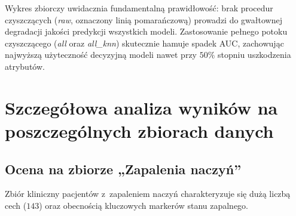 \begin{table}[H]
\centering
\caption{Średnia globalna wartość $\overline{\mathrm{AUC}}$ dla wszystkich badanych zbiorów danych i~modeli w~funkcji poziomu uszkodzeń dla 7 badanych strategii}
\label{tab:zbiorcze_krzywe}
\vspace{0.2cm}
\end{table}

Wykres zbiorczy uwidacznia fundamentalną prawidłowość: brak procedur czyszczących (\textit{raw}, oznaczony linią pomarańczową) prowadzi do gwałtownej degradacji jakości predykcji wszystkich modeli. Zastosowanie pełnego potoku czyszczącego (\textit{all} oraz \textit{all\_knn}) skutecznie hamuje spadek AUC, zachowując najwyższą użyteczność decyzyjną modeli nawet przy $50\%$ stopniu uszkodzenia atrybutów.

\section{Szczegółowa analiza wyników na poszczególnych zbiorach danych}

\subsection{Ocena na zbiorze „Zapalenia naczyń”}
Zbiór kliniczny pacjentów z~zapaleniem naczyń charakteryzuje się dużą liczbą cech ($143$) oraz obecnością kluczowych markerów stanu zapalnego.

